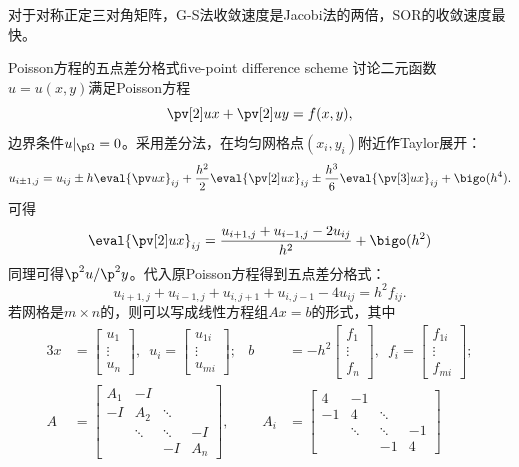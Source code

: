 \begin{remark}
    对于对称正定三对角矩阵，G-S法收敛速度是Jacobi法的两倍，SOR的收敛速度最快。
\end{remark}

\begin{example}
    {Poisson方程的五点差分格式}{five-point difference scheme}
    讨论二元函数$u=u(x,y)$满足Poisson方程
    \[
        \pv[2]ux+\pv[2]uy=f(x,y),
    \]
    边界条件$u|_{\p\Omega}=0$。采用差分法，在均匀网格点$(x_i,y_i)$附近作Taylor展开：
    \[
        u_{i\pm 1,j}=u_{ij}\pm h\eval{\pv ux}_{ij}+\frac{h^2}2\eval{\pv[2]ux}_{ij}\pm\frac{h^3}6\eval{\pv[3]ux}_{ij}+\bigo(h^4).
    \]
    可得
    \[
        \eval{\pv[2]ux}_{ij}=\frac{u_{i+1,j}+u_{i-1,j}-2u_{ij}}{h^2}+\bigo(h^2)
    \]
    同理可得$\p^2u/\p^2y$。代入原Poisson方程得到五点差分格式：
    \begin{equation}
        u_{i+1,j}+u_{i-1,j}+u_{i,j+1}+u_{i,j-1}-4u_{ij}=h^2f_{ij}.
    \end{equation}
    若网格是$m\times n$的，则可以写成线性方程组$Ax=b$的形式，其中        
    \begin{alignat*}{3}
        x&=\begin{bmatrix}
            u_1\\\vdots\\ u_n
        \end{bmatrix},\enspace u_i=\begin{bmatrix}
            u_{1i}\\\vdots\\u_{mi}
        \end{bmatrix};&
        b&=-h^2\begin{bmatrix}
            f_1\\\vdots\\f_n
        \end{bmatrix},\enspace f_i=\begin{bmatrix}
            f_{1i}\\\vdots\\f_{mi}
        \end{bmatrix};\\
        A&=\begin{bmatrix}
            A_1&-I\\-I&A_2&\ddots\\ &\ddots&\ddots&-I\\ &&-I&A_n
        \end{bmatrix},&\quad A_i&=\begin{bmatrix}
            4&-1\\-1&4&\ddots\\ &\ddots&\ddots&-1\\ &&-1&4

\end{bmatrix}
\end{alignat*}
\end{example}
